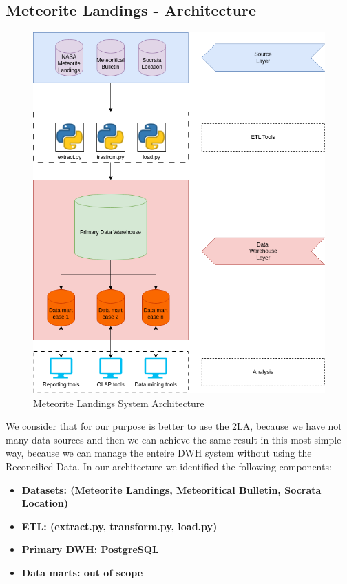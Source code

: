 \documentclass[conference]{IEEEtran}
\begin{document}
	\subsection{Meteorite Landings - Architecture}
	\begin{figure}[htpb]
		\centering
		\includegraphics[width=\columnwidth]{images/system_architecture.png}
		\caption{Meteorite Landings System Architecture}
		\label{fig:Meteorite Landings System Architecture}
	\end{figure}
	We consider that for our purpose is better to use the 2LA, because we have not many data sources and then we can achieve the same result in this most simple way, because we can manage the enteire DWH system without using the Reconcilied Data.  In our architecture we identified the following components:
	\begin{itemize}
		\item \textbf{Datasets: (Meteorite Landings, Meteoritical Bulletin, Socrata Location)}
		\item \textbf{ETL: (extract.py, transform.py, load.py)}
		\item \textbf{Primary DWH: PostgreSQL}
		\item \textbf{Data marts: out of scope}  
	\end{itemize}
	
\end{document}
